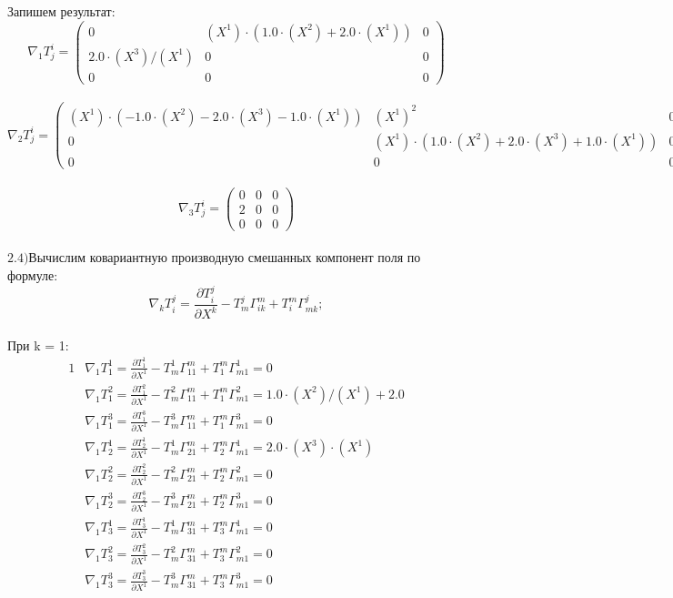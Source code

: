 \documentclass[a4paper, 12pt, oneside]{article}
\begin{document}
Запишем результат:\\
\[
\nabla_1T^i_j = \begin{pmatrix}
	0 & (X^1)\cdot (1.0\cdot (X^2) + 2.0\cdot (X^1)) & 0\\
	2.0\cdot (X^3)/(X^1) & 0 & 0\\
	0 & 0 & 0
\end{pmatrix}
\]\\
\[
\nabla_2T^i_j = \begin{pmatrix}
	(X^1)\cdot (-1.0\cdot (X^2) - 2.0\cdot (X^3) - 1.0\cdot (X^1)) & (X^1)^2 & 0\\
	0 & (X^1)\cdot (1.0\cdot (X^2) + 2.0\cdot (X^3) + 1.0\cdot (X^1)) & 0\\
	0 & 0 & 0
\end{pmatrix}
\]\\
\[
\nabla_3T^i_j = \begin{pmatrix}
	0 & 0 & 0\\
	2 & 0 & 0\\
	0 & 0 & 0
\end{pmatrix}
\]\\
$\mathrm{2.4) }$Вычислим ковариантную производную смешанных компонент поля по формуле:\\
\[
\nabla_kT^j_i = \frac{\partial T^j_i}{\partial X^k} - T^j_m\Gamma^m_{ik} + T^m_i\Gamma^j_{mk};
\]\\
При k = 1:\\
\begin{alignat*}{1}
  & \nabla_1T^1_1 = \frac{\partial T^1_1}{\partial X^1} - T^1_m\Gamma^m_{11} + T^m_1\Gamma^1_{m1} = 0 \\
  & \nabla_1T^2_1 = \frac{\partial T^2_1}{\partial X^1} - T^2_m\Gamma^m_{11} + T^m_1\Gamma^2_{m1} = 1.0\cdot (X^2)/(X^1) + 2.0 \\
  & \nabla_1T^3_1 = \frac{\partial T^3_1}{\partial X^1} - T^3_m\Gamma^m_{11} + T^m_1\Gamma^3_{m1} = 0 \\
  & \nabla_1T^1_2 = \frac{\partial T^1_2}{\partial X^1} - T^1_m\Gamma^m_{21} + T^m_2\Gamma^1_{m1} = 2.0\cdot (X^3)\cdot (X^1) \\
  & \nabla_1T^2_2 = \frac{\partial T^2_2}{\partial X^1} - T^2_m\Gamma^m_{21} + T^m_2\Gamma^2_{m1} = 0 \\
  & \nabla_1T^3_2 = \frac{\partial T^3_2}{\partial X^1} - T^3_m\Gamma^m_{21} + T^m_2\Gamma^3_{m1} = 0 \\
  & \nabla_1T^1_3 = \frac{\partial T^1_3}{\partial X^1} - T^1_m\Gamma^m_{31} + T^m_3\Gamma^1_{m1} = 0 \\
  & \nabla_1T^2_3 = \frac{\partial T^2_3}{\partial X^1} - T^2_m\Gamma^m_{31} + T^m_3\Gamma^2_{m1} = 0 \\
  & \nabla_1T^3_3 = \frac{\partial T^3_3}{\partial X^1} - T^3_m\Gamma^m_{31} + T^m_3\Gamma^3_{m1} = 0 
\end{alignat*}\\
\end{document}
